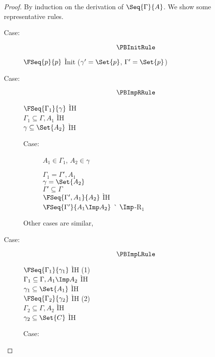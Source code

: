 \begin{proof}
  By induction on the derivation of $\Seq{\Gamma}{A}$.
  We show some representative rules.
  \begin{description}
  \item[Case:]
    \[ \PBInitRule \]
    \begin{tabbing}
      $\FSeq{p}{p}$ \` Init ($\gamma'=\Set{p}$, $\Gamma'=\Set{p}$) \\
    \end{tabbing}
  \item[Case:]
    \[ \PBImpRRule \]
    \begin{tabbing}
      $\FSeq{\Gamma_1}{\gamma}$ \` IH \\
      $\Gamma_1 \subseteq \Gamma, A_1$ \` IH \\
      $\gamma \subseteq \Set{A_2}$ \` IH \\
    \end{tabbing}
    \begin{description}
    \item[Case:]
      $A_1\in\Gamma_1$, $A_2\in\gamma$
      \begin{tabbing}
        $\Gamma_1=\Gamma',A_1$ \\
        $\gamma=\Set{A_2}$ \\
        $\Gamma' \subseteq \Gamma$ \\
        $\FSeq{\Gamma',A_1}{A_2}$ \` IH \\
        $\FSeq{\Gamma'}{A_1\Imp A_2}$ \` $\Imp$-R$_1$ \\
      \end{tabbing}
    \end{description}
    Other cases are similar, %
  \item[Case:]
    \[ \PBImpLRule \]
    \begin{tabbing}
      $\FSeq{\Gamma_1}{\gamma_1}$ \` IH (1) \\
      $\Gamma_1\subseteq \Gamma, A_1\Imp A_2$ \` IH \\
      $\gamma_1\subseteq \Set{A_1}$ \` IH \\
      $\FSeq{\Gamma_2}{\gamma_2}$ \` IH (2) \\
      $\Gamma_2\subseteq \Gamma, A_2$ \` IH \\
      $\gamma_2\subseteq \Set{C}$ \` IH \\
    \end{tabbing}
    \begin{description}
    \item[Case:]

\end{description}
\end{description}
\end{proof}
